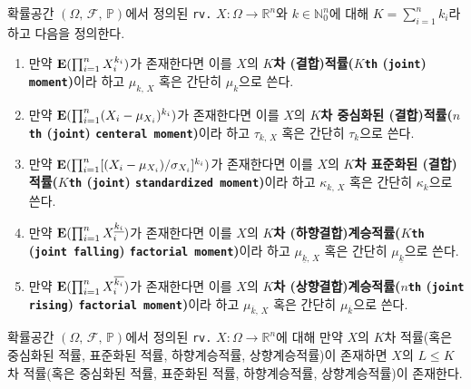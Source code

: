 \begin{definition}
    확률공간 $(\Omega,\,\mathcal{F},\,\mathbb{P})$에서 정의된 \texttt{rv.} $X:\Omega\to\mathbb{R}^n$와 $k\in\mathbb{N}_0^n$에 대해 $K=\sum_{i=1}^nk_i$라 하고 다음을 정의한다.
    \begin{enumerate}
        \item 만약 $\mathbf{E}(\prod_{i=1}^nX_i^{k_i})$가 존재한다면 이를 $X$의 \textbf{$K$차 (결합)적률($K$\texttt{th} (\texttt{joint}) \texttt{moment})}이라 하고 $\mu_{k,\,X}$ 혹은 간단히 $\mu_k$으로 쓴다.
        \item 만약 $\mathbf{E}(\prod_{i=1}^n(X_i-\mu_{X_i})^{k_i})$가 존재한다면 이를 $X$의 \textbf{$K$차 중심화된 (결합)적률($n$\texttt{th} (\texttt{joint}) \texttt{centeral moment})}이라 하고 $\tau_{k,\,X}$ 혹은 간단히 $\tau_k$으로 쓴다.
        \item 만약 $\mathbf{E}(\prod_{i=1}^n[(X_i-\mu_{X_i})/\sigma_{X_i}]^{k_i})$가 존재한다면 이를 $X$의 \textbf{$K$차 표준화된 (결합)적률($K$\texttt{th} (\texttt{joint}) \texttt{standardized moment})}이라 하고 $\kappa_{k,\,X}$ 혹은 간단히 $\kappa_k$으로 쓴다.
        \item 만약 $\mathbf{E}(\prod_{i=1}^nX_i^{\underline{k_i}})$가 존재한다면 이를 $X$의 \textbf{$K$차 (하향결합)계승적률($K$\texttt{th} (\texttt{joint falling}) \texttt{factorial moment})}이라 하고 $\mu_{\underline{k},\,X}$ 혹은 간단히 $\mu_{\underline{k}}$으로 쓴다.
        \item 만약 $\mathbf{E}(\prod_{i=1}^nX_i^{\overline{k_i}})$가 존재한다면 이를 $X$의 \textbf{$K$차 (상향결합)계승적률($n$\texttt{th} (\texttt{joint rising}) \texttt{factorial moment})}이라 하고 $\mu_{\overline{k},\,X}$ 혹은 간단히 $\mu_{\overline{k}}$으로 쓴다.
    \end{enumerate}
\end{definition}

\begin{proposition}\label{prop:loewrJointMomentExist}
    확률공간 $(\Omega,\,\mathcal{F},\,\mathbb{P})$에서 정의된 \texttt{rv.} $X:\Omega\to\mathbb{R}^n$에 대해 만약 $X$의 $K$차 적률(혹은 중심화된 적률, 표준화된 적률, 하향계승적률, 상향계승적률)이 존재하면 $X$의 $L\leq K$차 적률(혹은 중심화된 적률, 표준화된 적률, 하향계승적률, 상향계승적률)이 존재한다.
\end{proposition}

